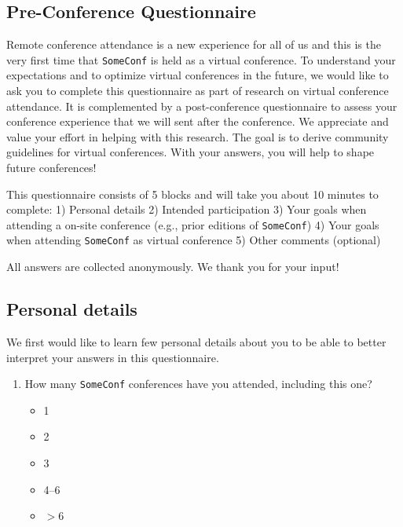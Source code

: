 \documentclass[sigconf]{acmart}
\newcommand{\confname}[0]{\texttt{SomeConf}\xspace}
\newcommand{\QO}{$\Box$}%
\newenvironment{Qlist}{%
\renewcommand{\labelitemi}{\QO}
\begin{itemize}[leftmargin=1.5em,topsep=-.5em]
}{%
\end{itemize}
}
\begin{document}
\begin{appendix}
\clearpage
%
\section{Pre-Conference Questionnaire}
\label{sec:preconf}


Remote conference attendance is a new experience for all of us and this is the very first time that \confname is held as a virtual conference. To understand your expectations and to optimize virtual conferences in the future, we would like to ask you to complete this questionnaire as part of research on virtual conference attendance. It is complemented by a post-conference questionnaire to assess your conference experience that we will sent after the conference. We appreciate and value your effort in helping with this research. The goal is to derive community guidelines for virtual conferences. With your answers, you will help to shape future conferences!

This questionnaire consists of 5 blocks and will take you about 10 minutes to complete:
1) Personal details
2) Intended participation
3) Your goals when attending a on-site conference (e.g., prior editions of \confname)
4) Your goals when attending \confname as virtual conference
5) Other comments (optional)

All answers are collected anonymously. We thank you for your input!

\subsection{Personal details}
We first would like to learn few personal details about you to be able to better interpret your answers in this questionnaire.

\begin{enumerate}

	\item How many \confname conferences have you attended, including this one?
		\begin{Qlist}
			\item 1
			\item 2
			\item 3
			\item 4--6
			\item $>6$
		\end{Qlist}


\end{enumerate}
\end{appendix}
\end{document}
